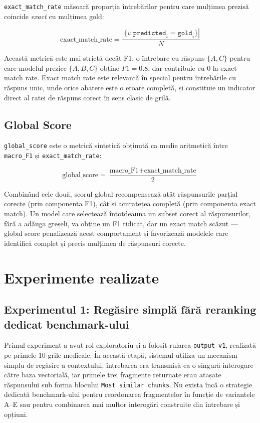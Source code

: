 \documentclass[12pt, a4paper, oneside, romanian]{teza-upb}
\begin{document}
\texttt{exact\_match\_rate} măsoară proporția întrebărilor pentru care mulțimea prezisă coincide \textit{exact} cu mulțimea gold:

\[ \text{exact\_match\_rate} = \frac{|\{i : \texttt{predicted}_i = \texttt{gold}_i\}|}{N} \]

Această metrică este mai strictă decât F1: o întrebare cu răspuns $\{A, C\}$ pentru care modelul prezice $\{A, B, C\}$ obține $F1 = 0.8$, dar contribuie cu $0$ la exact match rate. Exact match rate este relevantă în special pentru întrebările cu răspuns unic, unde orice abatere este o eroare completă, și constituie un indicator direct al ratei de răspuns corect în sens clasic de grilă.

\subsection{Global Score}

\texttt{global\_score} este o metrică sintetică obținută ca medie aritmetică între \texttt{macro\_F1} și \texttt{exact\_match\_rate}:

\[ \text{global\_score} = \frac{\text{macro\_F1} + \text{exact\_match\_rate}}{2} \]

Combinând cele două, scorul global recompensează atât răspunsurile parțial corecte (prin componenta F1), cât și acuratețea completă (prin componenta exact match). Un model care selectează întotdeauna un subset corect al răspunsurilor, fără a adăuga greșeli, va obține un F1 ridicat, dar un exact match scăzut --- global score penalizează acest comportament și favorizează modelele care identifică complet și precis mulțimea de răspunsuri corecte.


\section{Experimente realizate}

\subsection{Experimentul 1: Regăsire simplă fără reranking dedicat benchmark-ului}

Primul experiment a avut rol exploratoriu și a folosit rularea \texttt{output\_v1}, realizată pe primele 10 grile medicale. În această etapă, sistemul utiliza un mecanism simplu de regăsire a contextului: întrebarea era transmisă ca o singură interogare către baza vectorială, iar primele trei fragmente returnate erau atașate răspunsului sub forma blocului \texttt{Most similar chunks}. Nu exista încă o strategie dedicată benchmark-ului pentru reordonarea fragmentelor în funcție de variantele A--E sau pentru combinarea mai multor interogări construite din întrebare și opțiuni.
\end{document}
